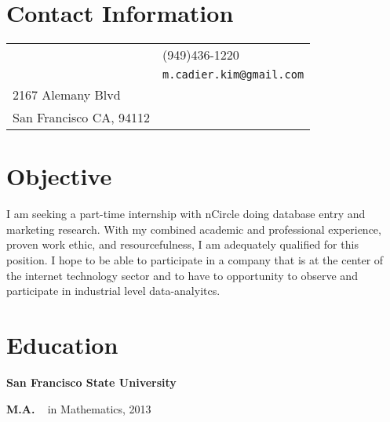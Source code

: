 \documentclass[margin,line,pifont,palatino,courier]{res}
\newenvironment{list1}{
  \begin{list}{\ding{113}}{%
      \setlength{\itemsep}{0in}
      \setlength{\parsep}{0in} \setlength{\parskip}{0in}
      \setlength{\topsep}{0in} \setlength{\partopsep}{0in}
      \setlength{\leftmargin}{0.17in}}}{\end{list}}
\begin{document}

\begin{resume}

\section{\sc Contact Information}

\vspace{.05in}
\begin{tabular}{@{}p{2.75in}p{2in}}
  & (949)436-1220 \\
                     & \verb+m.cadier.kim@gmail.com+\\

2167 Alemany Blvd              & \\
San Francisco CA, 94112              & \\
\end{tabular}


\section{\sc Objective}  I am seeking a part-time  internship with nCircle doing database entry and marketing research.  With my combined academic and professional experience, proven work ethic, and resourcefulness, I am adequately qualified for this position.  I hope to be able to participate in a company that is at the center of the internet technology sector and to have to opportunity to observe and participate in industrial level data-analyitcs.  
%

%
% 

\section{\sc Education}



{\bf San Francisco State University}\\
\vspace*{-.1in}
\begin{list1}
\item  \textbf{M.A.} ~ in Mathematics, 2013


\end{list1}
\end{resume}
\end{document}
